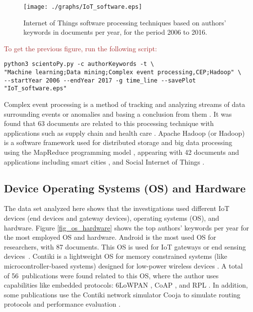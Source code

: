 \documentclass[symmetry,article,accept,moreauthors,pdftex10pt,a4paper]{mdpi}
\newcommand{\figuresWidth}{0.65\textwidth}
\begin{document}
\begin{figure}[H]
	\centering
	\texttt{[image: ./graphs/IoT\_software.eps]}
	\caption{Internet of Things software processing techniques based on authors' keywords in documents per year, for the period 2006 to 2016.}
	\label{fig_software_processing}
\end{figure} 

\noindent
\textcolor{brown}{To get the previous figure, run the following script:}\\
\begin{verbatim}
python3 scientoPy.py -c authorKeywords -t \
"Machine learning;Data mining;Complex event processing,CEP;Hadoop" \
--startYear 2006 --endYear 2017 -g time_line --savePlot "IoT_software.eps"
\end{verbatim}

Complex event processing is a method of tracking and analyzing streams of data surrounding events or anomalies and basing a conclusion from them \cite{Luckham:2001:PEI:515781}. It was found that 63 documents are related to this processing  technique with applications such as supply chain \cite{Li20131481,li2013,Liu2015} and health care \cite{Mohamedali201650,Sheriff2015}. Apache Hadoop (or Hadoop) is a software framework used for distributed storage and big data processing using the MapReduce programming model \cite{White:2009:HDG:1717298}, appearing with 42 documents and applications including smart cities \cite{Ji201422372,Hans2016352,TahmassebpourS1442}, and Social Internet of Things \cite{Ahmad20161101}.


\subsection{Device Operating Systems (OS) and Hardware}

The data set analyzed here shows that the investigations used different IoT devices (end devices and gateway devices), operating systems (OS), and hardware. Figure \ref{fig_os_hardware} shows the top authors' keywords per year for the most employed OS and hardware. Android is the most used OS for researchers, with 87 documents. This OS is used for IoT gateways \cite{Chen2015218,Bian2011526,Carlson2013619,Garcia201654} or end sensing devices~\mbox{\cite{Prakash2016,Sutar201673,Hossain20155095}}. Contiki is a lightweight OS for memory constrained systems (like microcontroller-based systems) designed for low-power wireless devices \cite{1367266}. A total of 56~publications were found related to this OS, where the author uses capabilities like embedded protocols: 6LoWPAN \cite{Bragg20161273,Anjana2016}, CoAP \cite{Yassein2016160}, and RPL \cite{Gonizzi20131400}. In addition, some publications use the Contiki network simulator Cooja to simulate routing protocols \cite{Banh2016206} and performance evaluation \cite{Sitanayah2013}.
\end{document}
